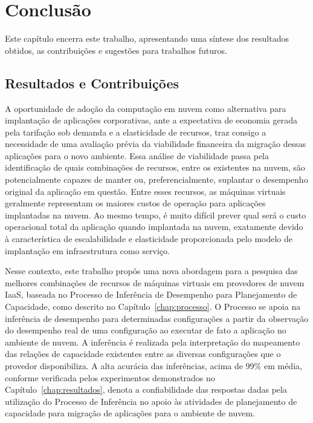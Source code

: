 \chapter{Conclusão}
\label{chap:conclusao}
Este capítulo encerra este trabalho, apresentando uma síntese dos resultados 
obtidos, as contribuições e sugestões para trabalhos futuros.

\section{Resultados e Contribuições}
A oportunidade de adoção da computação em nuvem como alternativa para implantação 
de aplicações corporativas, ante a expectativa de economia gerada pela tarifação 
sob demanda e a elasticidade de recursos, traz consigo a necessidade de uma
avaliação prévia da viabilidade financeira da migração dessas aplicações para
o novo ambiente. Essa análise de viabilidade passa pela identificação de quais 
combinações de recursos, entre os existentes na nuvem, são potencialmente capazes 
de manter ou, preferencialmente, suplantar o desempenho original da aplicação em 
questão. Entre esses recursos, as máquinas virtuais geralmente representam os
maiores custos de operação para aplicações implantadas na nuvem. Ao mesmo tempo,
é muito difícil prever qual será o custo operacional total da aplicação quando
implantada na nuvem, exatamente devido à característica de escalabilidade e 
elasticidade proporcionada pelo modelo de implantação em infraestrutura como
serviço.

Nesse contexto, este trabalho propôs uma nova abordagem para a pesquisa das 
melhores combinações de recursos de máquinas virtuais em provedores de nuvem IaaS,
baseada no Processo de Inferência de Desempenho para Planejamento de
Capacidade, como descrito no Capítulo~\ref{chap:processo}. O Processo se apoia
na inferência de desempenho para determinadas configurações a partir da observação
do desempenho real de uma configuração ao executar de fato a aplicação no
ambiente de nuvem. A inferência é realizada pela interpretação do mapeamento das 
relações de capacidade existentes entre as diversas configurações que o provedor 
disponibiliza. A alta acurácia das inferências, acima de 99\% em média, conforme 
verificada pelos experimentos demonstrados no Capítulo~\ref{chap:resultados}, denota 
a confiabilidade das respostas dadas pela utilização do Processo de Inferência 
no apoio às atividades de planejamento de capacidade para migração de aplicações 
para o ambiente de nuvem. 

